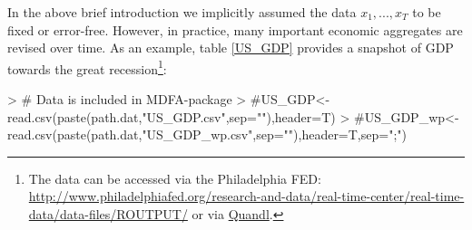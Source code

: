\documentclass[a4paper]{book}
\begin{document}
In the above brief introduction we implicitly assumed the data $x_1,...,x_T$ to be fixed or error-free. However, in practice, many important economic aggregates are revised over time. As an example, table \ref{US_GDP} provides a snapshot of GDP towards the great recession\footnote{The data can be accessed
via the Philadelphia FED: \url{http://www.philadelphiafed.org/research-and-data/real-time-center/real-time-data/data-files/ROUTPUT/} or via \href{https://www.quandl.com}{Quandl}.}:
\begin{Schunk}
\begin{Sinput}
> # Data is included in MDFA-package
> #US_GDP<-read.csv(paste(path.dat,"US_GDP.csv",sep=""),header=T)
> #US_GDP_wp<-read.csv(paste(path.dat,"US_GDP_wp.csv",sep=""),header=T,sep=";")
\end{Sinput}
\end{Schunk}
\end{document}
